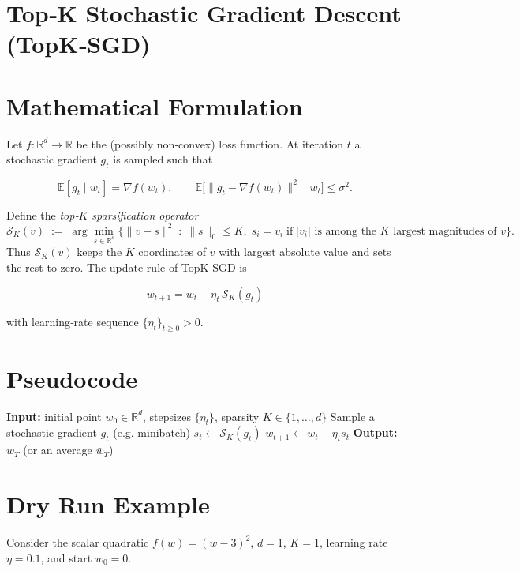 \documentclass{article}
\newcommand{\E}{\mathbb{E}}
\newcommand{\R}{\mathbb{R}}
\newcommand{\topk}{\mathcal{S}_K}
\begin{document}
\section*{Top‑K Stochastic Gradient Descent (TopK‑SGD)}

\section*{Mathematical Formulation}
Let $f:\R^{d}\rightarrow\R$ be the (possibly non‑convex) loss function.  
At iteration $t$ a stochastic gradient $g_{t}$ is sampled such that  

\[
\E[g_{t}\mid w_{t}] = \nabla f(w_{t}),\qquad 
\E\big[\|g_{t}-\nabla f(w_{t})\|^{2}\mid w_{t}\big]\le \sigma^{2}.
\]

Define the \emph{top‑$K$ sparsification operator}
\[
\topk(v)\;:=\; \arg\min_{s\in\R^{d}}\big\{\|v-s\|^{2}\;:\; \|s\|_{0}\le K,\; s_{i}=v_{i}\;\text{if}\;|v_{i}|\text{ is among the $K$ largest magnitudes of }v\big\}.
\]
Thus $\topk(v)$ keeps the $K$ coordinates of $v$ with largest absolute value and sets the rest to zero.
The update rule of TopK‑SGD is

\[
\boxed{ \; w_{t+1}= w_{t} - \eta_{t}\,\topk(g_{t}) \; } \tag{1}
\]

with learning‑rate sequence $\{\eta_{t}\}_{t\ge0}>0$.

\section*{Pseudocode}
\begin{algorithm}[H]
\caption{Top‑K Stochastic Gradient Descent}
\begin{algorithmic}[1]
\State \textbf{Input:} initial point $w_{0}\in\R^{d}$, stepsizes $\{\eta_{t}\}$, sparsity $K\in\{1,\dots,d\}$
    \State Sample a stochastic gradient $g_{t}$ (e.g. minibatch)
    \State $s_{t}\gets \topk(g_{t})$ 
    \State $w_{t+1}\gets w_{t}-\eta_{t}s_{t}$ 
\EndFor
\State \textbf{Output:} $w_{T}$ (or an average $\bar w_T$)
\end{algorithmic}
\end{algorithm}

\section*{Dry Run Example}
Consider the scalar quadratic $f(w)=(w-3)^{2}$, $d=1$, $K=1$, learning rate $\eta=0.1$, and start $w_{0}=0$.
\end{document}
